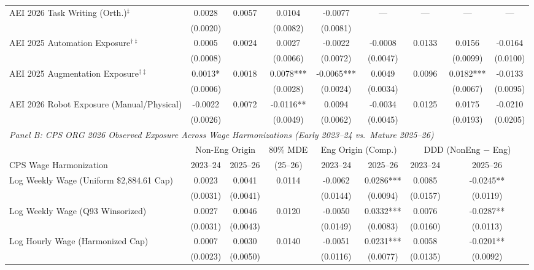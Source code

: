 \begin{table}[htbp]
{\begin{tabular}{lcccccccc}
AEI 2026 Task Writing (Orth.)$^\ddagger$ & 0.0028 & 0.0057 & 0.0104 & -0.0077 & --- & --- & --- & --- \\
 & (0.0020) & & (0.0082) & (0.0081) &  & &  &  \\
AEI 2025 Automation Exposure$^{\dagger\ddagger}$ & 0.0005 & 0.0024 & 0.0027 & -0.0022 & -0.0008 & 0.0133 & 0.0156 & -0.0164 \\
 & (0.0008) & & (0.0066) & (0.0072) & (0.0047) & & (0.0099) & (0.0100) \\
AEI 2025 Augmentation Exposure$^{\dagger\ddagger}$ & 0.0013* & 0.0018 & 0.0078*** & -0.0065*** & 0.0049 & 0.0096 & 0.0182*** & -0.0133 \\
 & (0.0006) & & (0.0028) & (0.0024) & (0.0034) & & (0.0067) & (0.0095) \\
AEI 2026 Robot Exposure (Manual/Physical) & -0.0022 & 0.0072 & -0.0116** & 0.0094 & -0.0034 & 0.0125 & 0.0175 & -0.0210 \\
 & (0.0026) & & (0.0049) & (0.0062) & (0.0045) & & (0.0193) & (0.0205) \\
\midrule
\multicolumn{9}{l}{\textit{Panel B: CPS ORG 2026 Observed Exposure Across Wage Harmonizations (Early 2023--24 vs.\ Mature 2025--26)}} \\
\addlinespace[3pt]
 & \multicolumn{2}{c}{Non-Eng Origin} & 80\% MDE & \multicolumn{2}{c}{Eng Origin (Comp.)} & \multicolumn{3}{c}{DDD (NonEng $-$ Eng)} \\
\cmidrule(lr){2-3} \cmidrule(lr){5-6} \cmidrule(lr){7-9}
CPS Wage Harmonization & 2023--24 & 2025--26 & (25--26) & 2023--24 & 2025--26 & 2023--24 & \multicolumn{2}{c}{2025--26} \\
\addlinespace[2pt]
Log Weekly Wage (Uniform \$2,884.61 Cap) & 0.0023 & 0.0041 & 0.0114 & -0.0062 & 0.0286*** & 0.0085 & \multicolumn{2}{c}{-0.0245**} \\
 & (0.0031) & (0.0041) & & (0.0144) & (0.0094) & (0.0157) & \multicolumn{2}{c}{(0.0119)} \\
Log Weekly Wage (Q93 Winsorized) & 0.0027 & 0.0046 & 0.0120 & -0.0050 & 0.0332*** & 0.0076 & \multicolumn{2}{c}{-0.0287**} \\
 & (0.0031) & (0.0043) & & (0.0149) & (0.0083) & (0.0160) & \multicolumn{2}{c}{(0.0113)} \\
Log Hourly Wage (Harmonized Cap) & 0.0007 & 0.0030 & 0.0140 & -0.0051 & 0.0231*** & 0.0058 & \multicolumn{2}{c}{-0.0201**} \\
 & (0.0023) & (0.0050) & & (0.0116) & (0.0077) & (0.0135) & \multicolumn{2}{c}{(0.0092)} \\

\end{tabular}}
\end{table}
